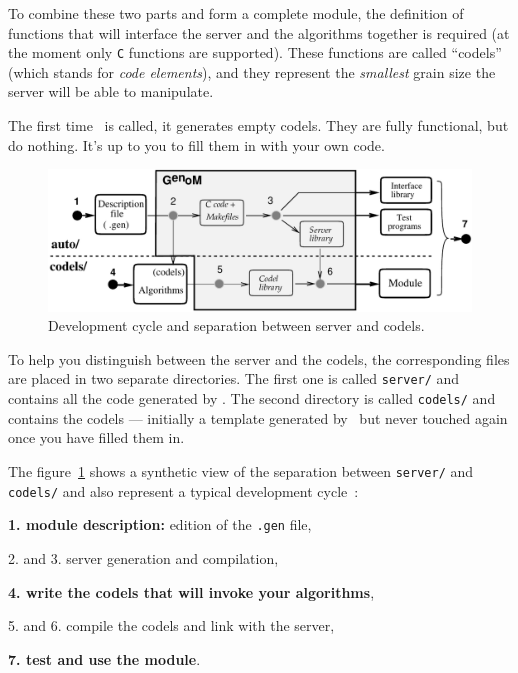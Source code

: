 To combine these two parts and form  a complete module, the definition of
functions that  will interface the server and  the algorithms together is
required (at the moment  only \texttt{C}  functions are  supported).  These
functions are  called ``codels'' (which  stands for \emph{code elements}),
and they represent the \emph{smallest} grain size  the server will be able
to manipulate.

The first  time \GenoM\  is called,  it generates empty  codels. They are
fully  functional, but do  nothing. It's up to  you to fill  them in with
your own code.

\bigbreak

\begin{figure}[htbp]
\centering
\includegraphics[width=0.8\hsize]{fig/cycle-en}
\caption{Development cycle and separation between server and codels.}
\label{fig|session|cycle}
\end{figure}

To help   you distinguish  between   the  server   and the   codels,  the
corresponding files are placed in two separate directories. The first one
is called \texttt{server/} and contains all  the code generated by \GenoM. The
second directory is called \texttt{codels/} and  contains the codels   ---
initially a template generated by \GenoM\ but never touched again once
you have filled them in.

\bigbreak

The figure~\ref{fig|session|cycle} shows a synthetic view of the
separation between \texttt{server/} and \texttt{codels/} and also represent a
typical development cycle~:

\begin{description}
   \item\textbf{1. module description:} edition of the \texttt{.gen} file,
   \item{2. and 3. server generation and compilation},
   \item\textbf{4. write the codels that will invoke your algorithms},
   \item{5. and 6. compile the codels and link with the server},
   \item\textbf{7. test and use the module}.
\end{description}

